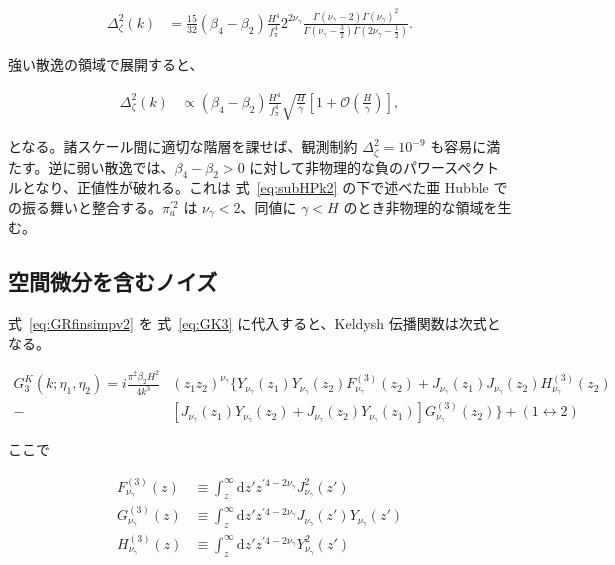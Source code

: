\documentclass[a4paper,11pt]{ltjsarticle}
\numberwithin{equation}{section}
\def\pia{\pi_{a}}
\newcommand{\dd}{\mathrm{d}}
\newcommand{\Eq}[1]{Eq.~(\ref{#1})}
\renewcommand{\Eq}[1]{式~\eqref{#1}}
\begin{document}
\begin{align}
\Delta^2_\zeta(k) &=   \frac{15}{32}(\beta_4- \beta_2)\frac{H^4}{f_\pi^4} 2^{2\nu_\gamma} \frac{\Gamma\left(\nu_\gamma-2\right)\Gamma\left(\nu_\gamma\right)^2}{\Gamma\left(\nu_\gamma - \frac{3}{2}\right)\Gamma\left(2\nu_\gamma - \frac{1}{2}\right)}. \label{eq:PK2SH}
\end{align}

強い散逸の領域で展開すると、

\begin{align}
    \Delta^2_\zeta(k)  &\propto (\beta_4- \beta_2)  \frac{H^4}{f_\pi^4}  \sqrt{\frac{H}{\gamma}}\left[1 + \mathcal{O}\left(\frac{H}{\gamma}\right) \right],
\end{align}

となる。諸スケール間に適切な階層を課せば、観測制約 $\Delta_\zeta^2=10^{-9}$ も容易に満たす。逆に弱い散逸では、$\beta_4-\beta_2>0$ に対して非物理的な負のパワースペクトルとなり、正値性が破れる。これは \Eq{eq:subHPk2} の下で述べた亜 Hubble での振る舞いと整合する。$\pia^{\prime2}$ は $\nu_\gamma<2$、同値に $\gamma<H$ のとき非物理的な領域を生む。

\subsection*{空間微分を含むノイズ}

\Eq{eq:GRfinsimpv2} を \Eq{eq:GK3} に代入すると、Keldysh 伝播関数は次式となる。

\begin{align}
    G^K_3(k;\eta_1,\eta_2) = i\frac{\pi^2 \beta_2 H^2}{4 k^3}  &(z_1 z_2)^{\nu_\gamma} \bigg\{ Y_{\nu_\gamma}(z_1) Y_{\nu_\gamma}(z_2) F^{(3)}_{\nu_\gamma}(z_2) + J_{\nu_\gamma}(z_1) J_{\nu_\gamma}(z_2) H^{(3)}_{\nu_\gamma}(z_2) \nonumber \\
    -& \left[J_{\nu_\gamma}(z_1)Y_{\nu_\gamma}(z_2) + J_{\nu_\gamma}(z_2)Y_{\nu_\gamma}(z_1)\right]G^{(3)}_{\nu_\gamma}(z_2) \bigg\} + (1 \leftrightarrow 2)
\end{align}

ここで

\begin{align}
F^{(3)}_{\nu_\gamma}(z) &\equiv \int_{z}^{\infty} \dd z' z^{\prime4 - 2{\nu_\gamma}} J^2_{\nu_\gamma}(z') \\
        G^{(3)}_{\nu_\gamma}(z) &\equiv \int_{z}^{\infty} \dd z' z^{\prime4 - 2{\nu_\gamma}} J_{\nu_\gamma}(z') Y_{\nu_\gamma}(z') \\
        H^{(3)}_{\nu_\gamma}(z)&\equiv \int_{z}^{\infty} \dd z' z^{\prime4 - 2{\nu_\gamma}} Y^2_{\nu_\gamma}(z')
\end{align}
\end{document}
